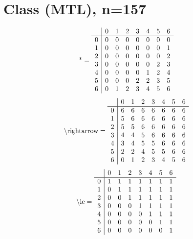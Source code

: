\documentclass[11pt]{article}
\begin{document}
\section{Class (MTL), n=157}
\[\text{*} = 
\begin{array}{r | r r r r r r r}
 & 0 & 1 & 2 & 3 & 4 & 5 & 6 \\ \hline
0 & 0 & 0 & 0 & 0 & 0 & 0 & 0 \\
1 & 0 & 0 & 0 & 0 & 0 & 0 & 1 \\
2 & 0 & 0 & 0 & 0 & 0 & 0 & 2 \\
3 & 0 & 0 & 0 & 0 & 0 & 2 & 3 \\
4 & 0 & 0 & 0 & 0 & 1 & 2 & 4 \\
5 & 0 & 0 & 0 & 2 & 2 & 3 & 5 \\
6 & 0 & 1 & 2 & 3 & 4 & 5 & 6 \\
\end{array}
\]
\[\text{\textbackslash rightarrow} = 
\begin{array}{r | r r r r r r r}
 & 0 & 1 & 2 & 3 & 4 & 5 & 6 \\ \hline
0 & 6 & 6 & 6 & 6 & 6 & 6 & 6 \\
1 & 5 & 6 & 6 & 6 & 6 & 6 & 6 \\
2 & 5 & 5 & 6 & 6 & 6 & 6 & 6 \\
3 & 4 & 4 & 5 & 6 & 6 & 6 & 6 \\
4 & 3 & 4 & 5 & 5 & 6 & 6 & 6 \\
5 & 2 & 2 & 4 & 5 & 5 & 6 & 6 \\
6 & 0 & 1 & 2 & 3 & 4 & 5 & 6 \\
\end{array}
\]
\[\text{\textbackslash le} = 
\begin{array}{r | r r r r r r r}
 & 0 & 1 & 2 & 3 & 4 & 5 & 6 \\ \hline
0 & 1 & 1 & 1 & 1 & 1 & 1 & 1 \\
1 & 0 & 1 & 1 & 1 & 1 & 1 & 1 \\
2 & 0 & 0 & 1 & 1 & 1 & 1 & 1 \\
3 & 0 & 0 & 0 & 1 & 1 & 1 & 1 \\
4 & 0 & 0 & 0 & 0 & 1 & 1 & 1 \\
5 & 0 & 0 & 0 & 0 & 0 & 1 & 1 \\
6 & 0 & 0 & 0 & 0 & 0 & 0 & 1 \\
\end{array}
\]
\end{document}
